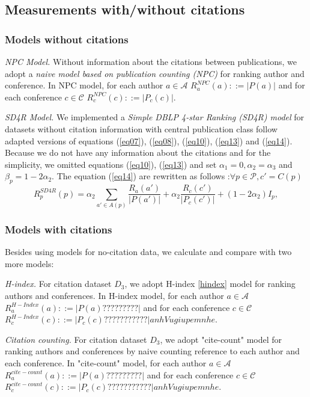 \documentclass[10pt,leqno,twoside]{article}
\begin{document}
\subsection{Measurements with/without citations}\label{Sect:Measure}
\subsubsection{Models without citations}
\textit{NPC Model.} Without information about the citations between publications, we adopt a \textit{naive model based on publication counting (NPC)} for ranking author and conference. In NPC model, for each author $a \in \mathcal{A}$  $R^{NPC}_a(a) ::= |P(a)| $ and for each conference $c \in \mathcal{C}$  $R^{NPC}_c(c) ::= |P_c(c)|$.

\textit{SD4R Model.} We implemented a \textit{Simple DBLP 4-star Ranking (SD4R) model} for datasets without citation information with central publication class follow adapted versions of equations (\ref{eq07}), (\ref{eq08}), (\ref{eq10}), (\ref{eq13}) and (\ref{eq14}).
Because we do not have any information about the citations and for the simplicity, we omitted equations (\ref{eq10}), (\ref{eq13}) and set $\alpha_1=0, \alpha_2=\alpha_3$ and $\beta_p = 1-2\alpha_2 $.  The equation (\ref{eq14}) are rewritten as follows :$\forall p\in\mathcal{P}, c' = C(p)$\
\begin{equation}\label{eq15}
R^{SD4R}_p(p) = \alpha_2\sum_{a'\in A(p)}\frac{R_a(a')}{|P(a')|} + \alpha_2\frac{R_c(c')}{|P_c(c')|} + (1-2\alpha_2)I_p,
\end{equation}
%

\subsubsection{Models with citations}
Besides using models for no-citation data, we calculate and compare with two more models:

\textit{H-index.} For citation dataset $D_3$, we adopt H-index \ref{hindex} model for ranking authors and conferences. In H-index model, for each author $a \in \mathcal{A}$  $R^{H-Index}_a(a) ::= |P(a)?????????| $ and for each conference $c \in \mathcal{C}$  $R^{H-Index}_c(c) ::= |P_c(c)???????????|
anh Vu giup em nhe$.


\textit{Citation counting.} For citation dataset $D_3$, we adopt "cite-count" model for ranking authors and conferences by naive counting reference to each author and each conference. In "cite-count" model, for each author $a \in \mathcal{A}$  $R^{cite-count}_a(a) ::= |P(a)?????????| $ and for each conference $c \in \mathcal{C}$  $R^{cite-count}_c(c) ::= |P_c(c)???????????|
anh Vu giup em nhe$.
\end{document}
